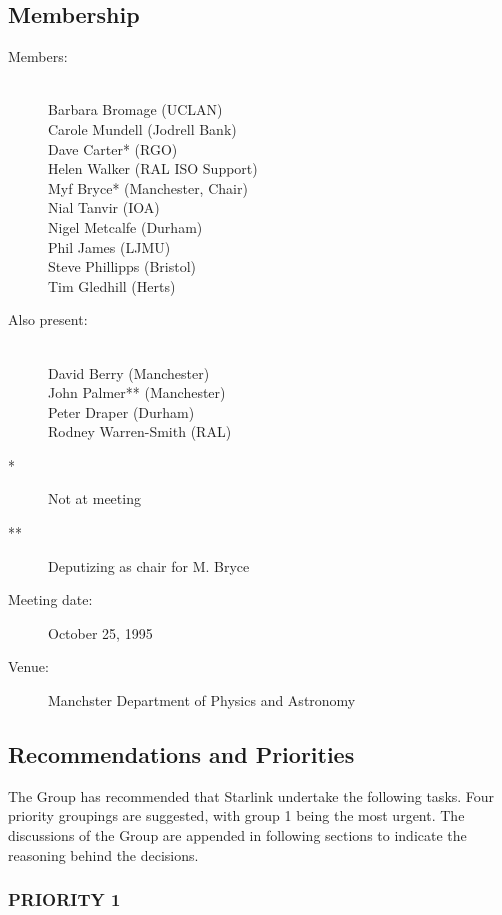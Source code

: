 \subsection{Membership}

\begin{description}
\item[Members:]\mbox{}\\
Barbara Bromage (UCLAN)\\
Carole Mundell (Jodrell Bank)\\
Dave Carter* (RGO)\\
Helen Walker (RAL ISO Support)\\
Myf Bryce* (Manchester, Chair)\\
Nial Tanvir (IOA)\\
Nigel Metcalfe (Durham)\\
Phil James (LJMU)\\
Steve Phillipps (Bristol)\\
Tim Gledhill (Herts)

\item[Also present:]\mbox{}\\
David Berry (Manchester)\\
John Palmer** (Manchester)\\
Peter Draper (Durham)\\
Rodney Warren-Smith (RAL)

\item[*] Not at meeting
\item[**] Deputizing as chair for M. Bryce

\item[Meeting date:]October 25, 1995

\item[Venue:]Manchster Department of Physics and Astronomy
\end{description}

\subsection{Recommendations and Priorities}

The Group has recommended that Starlink undertake the following tasks.
Four priority groupings are suggested, with group 1 being the most
urgent.  The discussions of the Group are appended in following
sections to indicate the reasoning behind the decisions.

\subsubsection{\label{ipSSG:astrom}PRIORITY 1}

